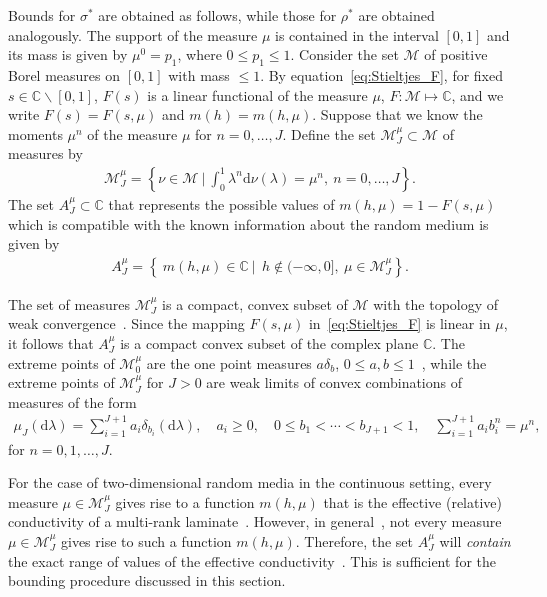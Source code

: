 \documentclass{cmslatex}
\renewcommand{\d}{\text{d}}
\begin{document}
Bounds for $\sigma^*$ are obtained as follows, while those for $\rho^*$ are
obtained analogously. The support of the measure 
$\mu$ is contained in the interval $[0,1]$ and its mass is given by
$\mu^0=p_1$, where $0\leq p_1\leq1$. Consider the set $\mathscr{M}$ of
positive Borel measures on $[0,1]$ with mass $\leq1$. By
equation~\eqref{eq:Stieltjes_F}, for fixed $s\in\mathbb{C}\backslash[0,1]$,
$F(s)$ is a linear functional of the measure $\mu$,
$F:\mathscr{M}\mapsto\mathbb{C}$, and we write $F(s)=F(s,\mu)$ and
$m(h)=m(h,\mu)$. Suppose that we know the moments $\mu^n$ of the measure
$\mu$ for $n=0,\ldots,J$. Define the set $\mathscr{M}_J^\mu\subset\mathscr{M}$ of
measures by 
% 
\begin{align}\label{eq:Measure_Set}
  \mathscr{M}_J^\mu
     =\left\{\nu\in\mathscr{M} \ \Big| \   \int_0^1\lambda^n\d\nu(\lambda)=\mu^n, \  n=0,\ldots,J\right\}. 
\end{align}
%
The set $A_J^\mu\subset\mathbb{C}$ that represents the possible
values of $m(h,\mu)=1-F(s,\mu)$ which is compatible with the
known information about the random medium is given by
%
\begin{align}\label{eq:Bounding_Set}
  A_J^\mu
     =\left\{\ m(h,\mu)\in\mathbb{C} \ | \
       \ h\not\in(-\infty,0], \ \mu\in \mathscr{M}_J^\mu\right\}. 
\end{align}
%



The set of measures $\mathscr{M}_J^\mu$ is a compact, convex
subset of $\mathscr{M}$ with the topology of weak
convergence~\cite{Golden:CMP-473}. Since the mapping $F(s,\mu)$
in~\eqref{eq:Stieltjes_F} is linear in $\mu$, it follows that 
$A_J^\mu$ is a compact convex subset of the complex plane
$\mathbb{C}$. The extreme points of $\mathscr{M}_0^\mu$ are the one 
point measures $a\delta_b$, $0\leq a,b\leq1$~\cite{Dunford_Schwartz:LinOp_PtI},
while the extreme points of $\mathscr{M}_J^\mu$ for $J>0$ are weak limits
of convex combinations of measures of the
form~\cite{Karlin_Studden:Book:1966,Golden:CMP-473}   
%
\begin{align}\label{eq:Discrete_Measure}
  \mu_J(\d\lambda)=\sum_{i=1}^{J+1}a_i\delta_{b_i}(\d\lambda), \quad
  a_i\geq0, \quad 0\leq b_1<\cdots<b_{J+1}<1, \quad
  \sum_{i=1}^{J+1}a_ib_i^n=\mu^n,
\end{align}
%
for $n=0,1,\ldots,J$.


For the case of two-dimensional random media in the
continuous setting, every measure $\mu\in\mathscr{M}_J^\mu$ gives rise
to a function $m(h,\mu)$ that is the effective (relative) conductivity
of a multi-rank laminate~\cite{MILTON:2002:TC}.
However, in general~\cite{Golden:CMP-473},  not every measure
$\mu\in\mathscr{M}_J^\mu$ gives rise to such a function $m(h,\mu)$. Therefore,
the set $A_J^\mu$ will \emph{contain} the exact range of values of the
effective conductivity~\cite{Golden:CMP-473}. This is sufficient for
the bounding procedure discussed in this section. 
\end{document}

